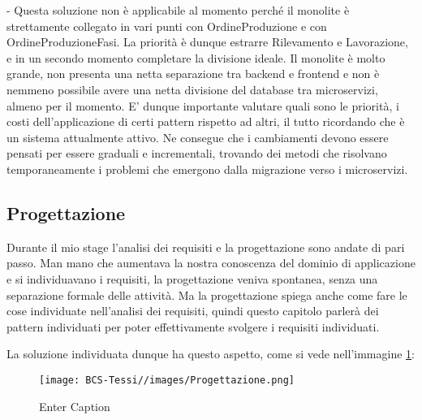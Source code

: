         - Questa soluzione non è applicabile al momento perché il monolite è strettamente collegato in vari punti con OrdineProduzione e con OrdineProduzioneFasi. La priorità è dunque estrarre Rilevamento e Lavorazione, e in un secondo momento completare la divisione ideale.
        Il monolite è molto grande, non presenta una netta separazione tra backend e frontend e non è nemmeno possibile avere una netta divisione del database tra microservizi, almeno per il momento. E' dunque importante valutare quali sono le priorità, i costi dell'applicazione di certi pattern rispetto ad altri, il tutto ricordando che è un sistema attualmente attivo. Ne consegue che i cambiamenti devono essere pensati per essere graduali e incrementali, trovando dei metodi che risolvano temporaneamente i problemi che emergono dalla migrazione verso i microservizi.


        \subsection{Progettazione}
        Durante il mio stage l'analisi dei requisiti e la progettazione sono andate di pari passo. Man mano che aumentava la nostra conoscenza del dominio di applicazione e si individuavano i requisiti, la progettazione veniva spontanea, senza una separazione formale delle attività. 
        Ma la progettazione spiega anche come fare le cose individuate nell'analisi dei requisiti, quindi questo capitolo parlerà dei pattern individuati per poter effettivamente svolgere i requisiti individuati.

        La soluzione individuata dunque ha questo aspetto, come si vede nell'immagine \ref{fig:progettazione}:
        
        \begin{figure}[H]
            \centering
            \texttt{[image: BCS-Tessi//images/Progettazione.png]}
            \caption{Enter Caption}
            \label{fig:progettazione}
        \end{figure}

